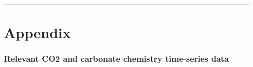 \vspace{1mm} \noindent\rule{4cm}{0.1mm} \vspace{2mm}

\newpage

\section{Appendix}

\subsubsection{Relevant CO2 and carbonate chemistry time-series data}

